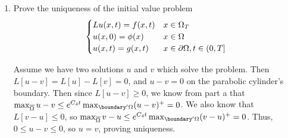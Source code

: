 \begin{enumerate}
\item
  Prove the uniqueness of the initial value problem
  $$
  \begin{cases}
    L u(x, t) = f(x, t) & x \in \Omega_T\\
    u(x, 0) = \phi(x) & x \in \Omega\\
    u(x, t) = g(x, t) & x \in \partial \Omega, t \in (0, T]
  \end{cases}
  $$

  Assume we have two solutions $u$ and $v$ which solve the problem.
  Then $L[u - v] = L[u] - L[v] = 0$, and $u - v = 0$ on the parabolic cylinder's boundary.
  Then since $L[u - v] \geq 0$, we know from part a that $\max_{\closure{\domain}}u - v \leq e^{C_4 t} \max_{\boundary' \domain} (u - v)^+ = 0$.
  We also know that $L[v - u] \leq 0$, so $\max_{\closure{\domain}}v - u \leq e^{C_4 t} \max_{\boundary' \domain} (v - u)^+ = 0$.
  Thus, $0 \leq u - v \leq 0$, so $u = v$, proving uniqueness.
\end{enumerate}
